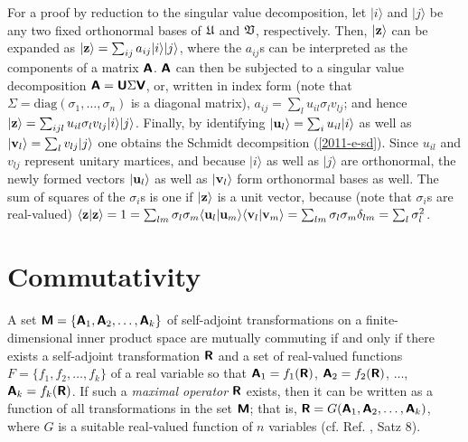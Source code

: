 For a proof by reduction to the singular value decomposition,
let
$\vert i\rangle$
and
$\vert j\rangle$
be any two fixed orthonormal bases of $ {\frak U}$ and $ {\frak V}$, respectively.
Then,
$\vert {\bf z}\rangle $
can be expanded as
$\vert {\bf z}\rangle  = \sum_{ij}a_{ij} \vert i\rangle \vert j\rangle$,
where the $a_{ij}$s can be interpreted as the components of a matrix
$\textsf{\textbf{A}}$.
$\textsf{\textbf{A}}$ can then be subjected to a
singular value decomposition
$\textsf{\textbf{A}} = \textsf{\textbf{U}} \Sigma \textsf{\textbf{V}}$,
or, written in index form (note that $\Sigma=\textrm{diag}(\sigma_1, \ldots, \sigma_n)$ is a diagonal matrix),
$a_{ij}= \sum_l u_{il}\sigma_l v_{lj}$;
and hence  $\vert {\bf z}\rangle  = \sum_{ijl} u_{il}\sigma_l v_{lj}\vert i\rangle \vert j\rangle$.
Finally, by identifying
$\vert {\bf u}_l  \rangle = \sum_i u_{il} \vert i\rangle$
as well as
$\vert {\bf v}_l  \rangle = \sum_l v_{lj} \vert j\rangle$
one obtains the Schmidt decompsition (\ref{2011-e-sd}).
Since $u_{il}$ and $v_{ lj}$ represent unitary martices,
and because
 $\vert i\rangle$ as well as
 $\vert j\rangle$
are orthonormal,
the newly formed vectors
$\vert {\bf u}_l \rangle$
as well as
$\vert {\bf v}_l  \rangle$
form orthonormal bases as well.
The sum of squares of the $\sigma_i$s is one if  $\vert {\bf z}\rangle $ is a unit vector,
because  (note that $\sigma_i$s are real-valued)
 $\langle {\bf z}\vert {\bf z}\rangle =1
=   \sum_{lm} \sigma_l \sigma_m   \langle {\bf u}_l  \vert  {\bf u}_m  \rangle   \langle  {\bf v}_l  \vert  {\bf v}_m  \rangle
=   \sum_{lm} \sigma_l \sigma_m  \delta_{lm}
=   \sum_{l} \sigma_l^2
$.






\section{Commutativity}

A set $\textsf{\textbf{M}}
=
\{
\textsf{\textbf{A}}_1,
\textsf{\textbf{A}}_2,
\ldots ,
\textsf{\textbf{A}}_k
\}
$
of  self-adjoint transformations on a finite-dimensional inner product space
are mutually commuting if and only if there exists
a self-adjoint transformation  $\textsf{\textbf{R}}$ and
a set of real-valued functions
$F
=
\{
f_1,
f_2,
\ldots ,
f_k
\}
$ of a real variable so that
$
\textsf{\textbf{A}}_1=f_1 (\textsf{\textbf{R}})
$,
$
\textsf{\textbf{A}}_2=f_2 (\textsf{\textbf{R}})
$,
$\ldots $,
$\textsf{\textbf{A}}_k=f_k (\textsf{\textbf{R}})$.
If such a {\em maximal operator} $\textsf{\textbf{R}}$ exists, then
it can be written as a function of all transformations in the set $\textsf{\textbf{M}}$; that is,
$\textsf{\textbf{R}}=G(\textsf{\textbf{A}}_1,
\textsf{\textbf{A}}_2,
\ldots ,
\textsf{\textbf{A}}_k)$,
where $G$ is a suitable real-valued function of $n$ variables
(cf. Ref. \cite{v-neumann-31}, Satz 8).

